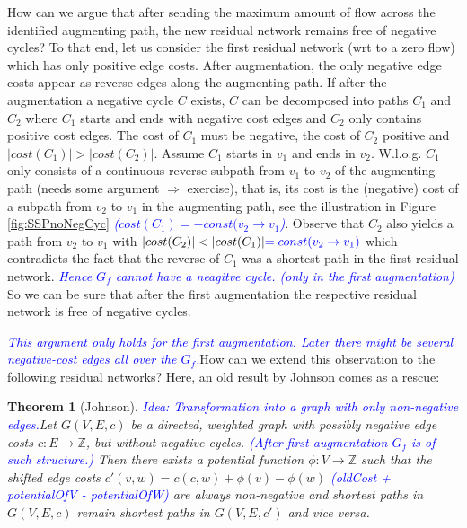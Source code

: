 \documentclass{article}
\newtheorem{theorem}{Theorem}
\begin{document}
How can we argue that after sending the maximum amount of flow across the identified augmenting path, the new residual network remains free of negative cycles? To that end, let us consider the first residual network (wrt to a zero flow) which has only positive edge costs. After augmentation, the only negative edge costs appear as reverse edges along the augmenting path. If after the augmentation a negative cycle $C$ exists, $C$ can be decomposed into paths $C_1$ and $C_2$ where $C_1$ starts and ends with negative cost edges and $C_2$ only contains positive cost edges. The cost of $C_1$ must be negative, the cost of $C_2$ positive and $|cost(C_1)|>|cost(C_2)|$. Assume $C_1$ starts in $v_1$ and ends in $v_2$.  W.l.o.g. $C_1$ only consists of a continuous reverse subpath from $v_1$ to $v_2$ of the augmenting path (needs some argument $\Rightarrow$ exercise), that is, its cost is the (negative) cost of a subpath from $v_2$ to $v_1$ in the augmenting path, see the illustration in Figure \ref{fig:SSPnoNegCyc} \textcolor{blue}{\emph{($cost(C_1) = - const(v_2 \rightarrow v_1$)}}. Observe that $C_2$ also yields a path from $v_2$ to $v_1$ with $|cost(C_2)|<|cost(C_1)| \textcolor{blue}{\emph{$= const(v_2 \rightarrow v_1)$}}$ which contradicts the fact that the reverse of $C_1$ was a shortest path in the first residual network. \textcolor{blue}{\emph{Hence $G_f$ cannot have a neagitve cycle. (only in the first augmentation)}} So we can be sure that after the first augmentation the respective residual network is free of negative cycles. 

\textcolor{blue}{\emph{This argument only holds for the first augmentation. Later there might be several negative-cost edges all over the $G_f$.}}How can we extend this observation to the following residual networks? Here, an old result by Johnson comes as a rescue:

\begin{theorem}[Johnson]
\textcolor{blue}{\emph{Idea: Transformation into a graph with only non-negative edges.}}Let $G(V,E,c)$ be a directed, weighted graph with possibly negative edge costs $c:E\rightarrow \mathbb{Z}$, but without negative cycles. \textcolor{blue}{\emph{(After first augmentation $G_f$ is of such structure.)}} Then there exists a potential function $\phi:V\rightarrow \mathbb{Z}$ such that the shifted edge costs $c'(v,w)=c(c,w)+\phi(v)-\phi(w)$ \textcolor{blue}{\emph{(oldCost + potentialOfV - potentialOfW)}} are always non-negative and shortest paths in $G(V,E,c)$ remain shortest paths in $G(V,E,c')$ and vice versa.
\end{theorem}
\end{document}
